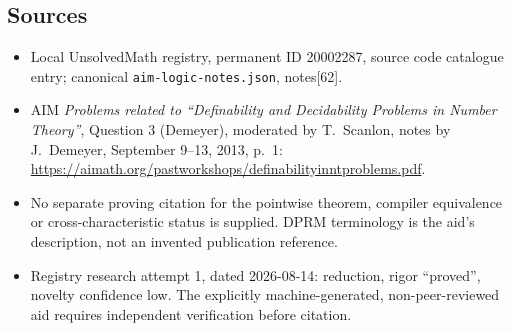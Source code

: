 \documentclass[11pt]{article}
\begin{document}
\subsection{Sources}
\begin{itemize}
\item Local UnsolvedMath registry, permanent ID 20002287, source code catalogue entry; canonical \texttt{aim-logic-notes.json}, notes[62].
\item AIM \emph{Problems related to ``Definability and Decidability Problems in Number Theory''}, Question 3 (Demeyer), moderated by T.~Scanlon, notes by J.~Demeyer, September 9--13, 2013, p.~1: \url{https://aimath.org/pastworkshops/definabilityinntproblems.pdf}.
\item No separate proving citation for the pointwise theorem, compiler equivalence or cross-characteristic status is supplied. DPRM terminology is the aid's description, not an invented publication reference.
\item Registry research attempt 1, dated 2026-08-14: reduction, rigor ``proved'', novelty confidence low. The explicitly machine-generated, non-peer-reviewed aid requires independent verification before citation.
\end{itemize}
\end{document}
